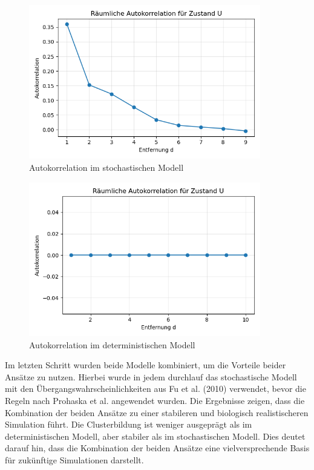 \documentclass{SeminarV2}
\begin{document}
\begin{figure} [htbp]
  \centering
  \includegraphics[width=0.9\textwidth]{images/Autokor_stoch.png}
  \caption{Autokorrelation im stochastischen Modell}
  \label{fig:cpg_states_auto_stoch}
  \end{figure}

\begin{figure}
  \centering
  \includegraphics[width=0.9\textwidth]{images/Autokor_det.png}
  \caption{Autokorrelation im deterministischen Modell}
  \label{fig:cpg_states_auto_det}
\end{figure}

Im letzten Schritt wurden beide Modelle kombiniert, um die Vorteile beider Ansätze zu nutzen.
Hierbei wurde in jedem durchlauf das stochastische Modell mit den Übergangswahrscheinlichkeiten aus Fu et al. (2010) verwendet, bevor die Regeln nach Prohaska et al. angewendet wurden.
Die Ergebnisse zeigen, dass die Kombination der beiden Ansätze zu einer stabileren und biologisch realistischeren Simulation führt. Die Clusterbildung ist weniger ausgeprägt als im deterministischen Modell, aber stabiler als im stochastischen Modell. Dies deutet darauf hin, dass die Kombination der beiden Ansätze eine vielversprechende Basis für zukünftige Simulationen darstellt.
\end{document}
